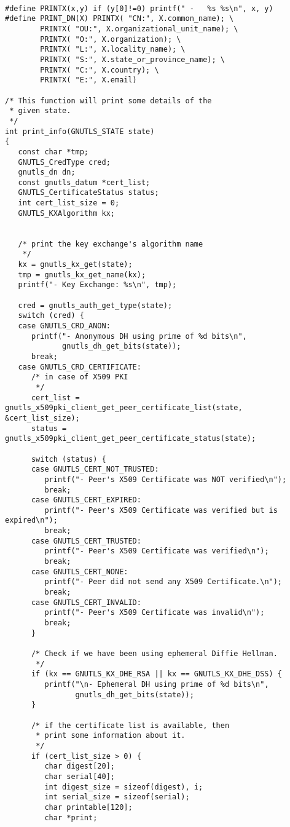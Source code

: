 \begin{verbatim}

#define PRINTX(x,y) if (y[0]!=0) printf(" -   %s %s\n", x, y)
#define PRINT_DN(X) PRINTX( "CN:", X.common_name); \
        PRINTX( "OU:", X.organizational_unit_name); \
        PRINTX( "O:", X.organization); \
        PRINTX( "L:", X.locality_name); \
        PRINTX( "S:", X.state_or_province_name); \
        PRINTX( "C:", X.country); \
        PRINTX( "E:", X.email)

/* This function will print some details of the
 * given state.
 */
int print_info(GNUTLS_STATE state)
{
   const char *tmp;
   GNUTLS_CredType cred;
   gnutls_dn dn;
   const gnutls_datum *cert_list;
   GNUTLS_CertificateStatus status;
   int cert_list_size = 0;
   GNUTLS_KXAlgorithm kx;


   /* print the key exchange's algorithm name
    */
   kx = gnutls_kx_get(state);
   tmp = gnutls_kx_get_name(kx);
   printf("- Key Exchange: %s\n", tmp);

   cred = gnutls_auth_get_type(state);
   switch (cred) {
   case GNUTLS_CRD_ANON:
      printf("- Anonymous DH using prime of %d bits\n",
             gnutls_dh_get_bits(state));
      break;
   case GNUTLS_CRD_CERTIFICATE:
      /* in case of X509 PKI
       */
      cert_list = gnutls_x509pki_client_get_peer_certificate_list(state, &cert_list_size);
      status = gnutls_x509pki_client_get_peer_certificate_status(state);

      switch (status) {
      case GNUTLS_CERT_NOT_TRUSTED:
         printf("- Peer's X509 Certificate was NOT verified\n");
         break;
      case GNUTLS_CERT_EXPIRED:
         printf("- Peer's X509 Certificate was verified but is expired\n");
         break;
      case GNUTLS_CERT_TRUSTED:
         printf("- Peer's X509 Certificate was verified\n");
         break;
      case GNUTLS_CERT_NONE:
         printf("- Peer did not send any X509 Certificate.\n");
         break;
      case GNUTLS_CERT_INVALID:
         printf("- Peer's X509 Certificate was invalid\n");
         break;
      }

      /* Check if we have been using ephemeral Diffie Hellman.
       */
      if (kx == GNUTLS_KX_DHE_RSA || kx == GNUTLS_KX_DHE_DSS) {
         printf("\n- Ephemeral DH using prime of %d bits\n",
                gnutls_dh_get_bits(state));
      }

      /* if the certificate list is available, then
       * print some information about it.
       */
      if (cert_list_size > 0) {
         char digest[20];
         char serial[40];
         int digest_size = sizeof(digest), i;
         int serial_size = sizeof(serial);
         char printable[120];
         char *print;


\end{verbatim}
